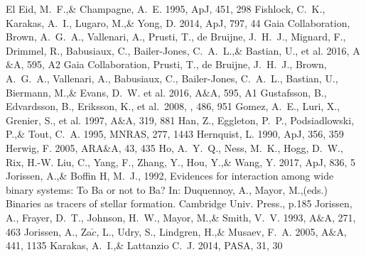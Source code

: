 \documentclass[a4paper,fleqn,usenatbib]{mnras}
\begin{document}
\begin{thebibliography}{99}
El Eid, M.~F.,\& Champagne, A.~E. 1995, 
ApJ, 451, 298
Fishlock, C.~K., Karakas, A.~I., Lugaro, M.,\& Yong, D. 2014, 
ApJ, 797, 44
Gaia Collaboration, Brown, A.~G.~A., Vallenari, A., Prusti, T., de Bruijne, J.~H.~J., Mignard, F., Drimmel, R., Babusiaux, C., Bailer-Jones, C.~A.~L.,\& Bastian, U., et al. 2016, 
A$\&$A, 595, A2
Gaia Collaboration, Prusti, T., de Bruijne, J.~H.~J., Brown, A.~G.~A., Vallenari, A., Babusiaux, C., Bailer-Jones, C.~A.~L., Bastian, U., Biermann, M.,\& Evans, D.~W. et al. 2016, 
A$\&$A, 595, A1
 Gustafsson, B., Edvardsson, B., Eriksson, K., et al.\ 2008, \aap, 486, 951 
Gomez, A.~E., Luri, X., Grenier, S., et al. 1997, 
A$\&$A, 319, 881
Han, Z., Eggleton, P.~P., Podsiadlowski, P.,\& Tout, C.~A. 1995, 
MNRAS, 277, 1443
Hernquist, L. 1990, 
ApJ, 356, 359
Herwig, F. 2005, 
ARA$\&$A, 43, 435
Ho, A.~Y.~Q., Ness, M.~K., Hogg, D.~W., Rix, H.-W. Liu, C., Yang, F., Zhang, Y., Hou, Y.,\& Wang, Y. 2017, 
ApJ, 836, 5
Jorissen, A.,\& Boffin H, M.~J., 1992, 
Evidences for interaction among wide binary systems: To Ba or not to Ba? In: Duquennoy, A., Mayor, M.,(eds.) Binaries as tracers of stellar formation. Cambridge Univ. Press., p.185
Jorissen, A., Frayer, D.~T., Johnson, H.~W., Mayor, M.,\& Smith, V.~V. 1993, 
A$\&$A, 271, 463
Jorissen, A., Za$\check{c}$, L., Udry, S., Lindgren, H.,\& Musaev, F.~A. 2005, 
A$\&$A, 441, 1135
Karakas, A.~I.,\& Lattanzio C.~J. 2014, 
PASA, 31, 30

\end{thebibliography}
\end{document}
